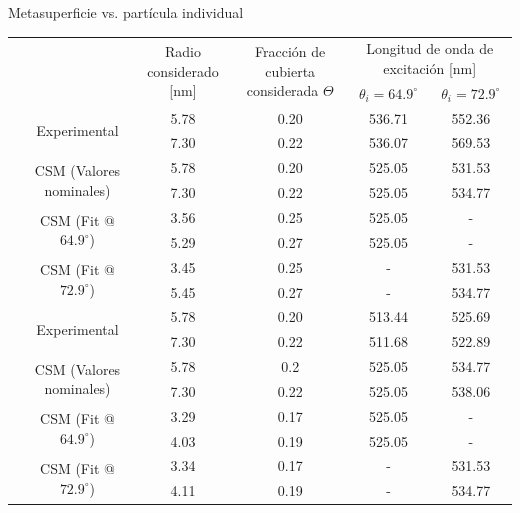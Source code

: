 \begin{frame}{Metasuperficie vs. partícula individual}
	{}
	\centering
			\begin{tabular}{c|c||cc||c|c} \hline\hline
		&   & \multirow{2}{8em}{Radio considerado {[}nm{]}} & \multirow{2}{11em}{\centering Fracción de cubierta considerada $\Theta$} & \multicolumn{2}{c}{Longitud de onda de excitación [nm]} \\ 
		&   & &    & $\theta_i = 64.9^\circ$  & $\theta_i = 72.9^\circ$ \\  \hline\hline
		\multirow{8}{*}{\rotatebox{90}{Polarización $s$}}& \multirow{2}{*}{Experimental}   & 5.78  & 0.20  & 536.71  & 552.36 \\
		&									& 7.30	& 0.22  & 536.07  & 569.53\\ \cline{2-6}
		& \multirow{2}{*}{CSM (Valores nominales)}						& 5.78  & 0.20  & 525.05  & 531.53 \\
		&									& 7.30	& 0.22  & 525.05  & 534.77 \\ \cline{2-6}
		& \multirow{2}{*}{CSM (Fit @ $64.9^\circ$)} 				& 3.56  & 0.25  & 525.05  & -  \\
		&								    & 5.29  & 0.27  & 525.05  & -  \\ \cline{2-6}
		& \multirow{2}{*}{CSM (Fit @ $72.9^\circ$)}					& 3.45  & 0.25  & - & 531.53    \\
		&   								& 5.45  & 0.27  & - & 534.77 \\ \hline\hline
		\multirow{8}{*}{\rotatebox{90}{Polarización $p$}} & \multirow{2}{*}{Experimental}   & 5.78  & 0.20   & 513.44 & 525.69 \\
		&								    & 7.30	& 0.22  & 511.68  & 522.89 \\ \cline{2-6}
		& \multirow{2}{*}{CSM (Valores nominales)} 					& 5.78  & 0.2   & 525.05  & 534.77 \\
		&							   	 	& 7.30	& 0.22  & 525.05  & 538.06 \\ \cline{2-6}
		& \multirow{2}{*}{CSM (Fit @ $64.9^\circ$)} 				& 3.29  & 0.17  & 525.05  & -  \\
		&								    & 4.03  & 0.19  & 525.05  & -  \\ \cline{2-6}
		& \multirow{2}{*}{CSM (Fit @ $72.9^\circ$)}					& 3.34  & 0.17  & - & 531.53 \\
		&								    & 4.11  & 0.19  & - & 534.77 \\ \hline\hline
	\end{tabular}
	
\end{frame}